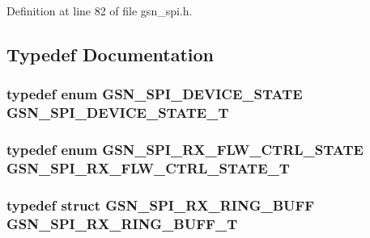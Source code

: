 Definition at line 82 of file gsn\_\-spi.h.



\subsection{Typedef Documentation}
\hypertarget{a00587_a6a9138b2111d919287d97122c32fbc02}{
\subsubsection[{GSN\_\-SPI\_\-DEVICE\_\-STATE\_\-T}]{\setlength{\rightskip}{0pt plus 5cm}typedef enum {\bf GSN\_\-SPI\_\-DEVICE\_\-STATE}  {\bf GSN\_\-SPI\_\-DEVICE\_\-STATE\_\-T}}}
\label{a00587_a6a9138b2111d919287d97122c32fbc02}
\hypertarget{a00587_a833a62a5682b1e7d499bd6334b2701f5}{
\subsubsection[{GSN\_\-SPI\_\-RX\_\-FLW\_\-CTRL\_\-STATE\_\-T}]{\setlength{\rightskip}{0pt plus 5cm}typedef enum {\bf GSN\_\-SPI\_\-RX\_\-FLW\_\-CTRL\_\-STATE} {\bf GSN\_\-SPI\_\-RX\_\-FLW\_\-CTRL\_\-STATE\_\-T}}}
\label{a00587_a833a62a5682b1e7d499bd6334b2701f5}
\hypertarget{a00587_a5884b8b45a9dd074d8fb6610ed9cd935}{
\subsubsection[{GSN\_\-SPI\_\-RX\_\-RING\_\-BUFF\_\-T}]{\setlength{\rightskip}{0pt plus 5cm}typedef struct {\bf GSN\_\-SPI\_\-RX\_\-RING\_\-BUFF}  {\bf GSN\_\-SPI\_\-RX\_\-RING\_\-BUFF\_\-T}}}
\label{a00587_a5884b8b45a9dd074d8fb6610ed9cd935}


